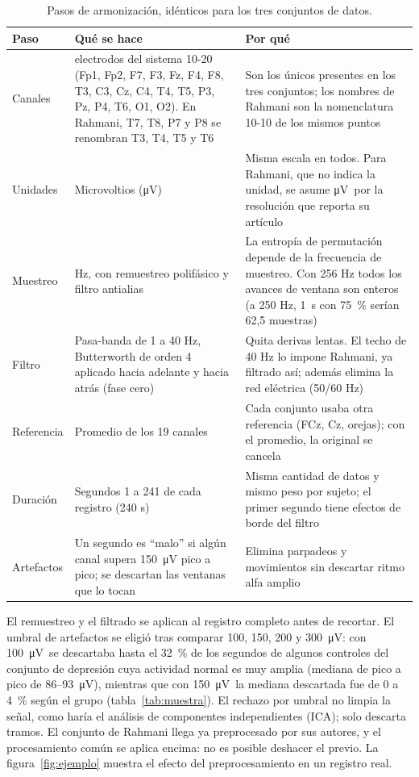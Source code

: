 \documentclass[11pt,a4paper]{article}
\newcommand{\uV}{\si{\micro\volt}}
\begin{document}
\begin{table}[ht]
\centering\small
\caption{Pasos de armonización, idénticos para los tres conjuntos de datos.}
\label{tab:preproc}
\begin{tabularx}{\textwidth}{@{}>{\raggedright\arraybackslash}p{1.9cm} >{\raggedright\arraybackslash}X >{\raggedright\arraybackslash}X@{}}
\toprule
Paso & Qué se hace & Por qué \\
\midrule
Canales & 19 electrodos del sistema 10-20 (Fp1, Fp2, F7, F3, Fz, F4, F8, T3, C3, Cz, C4, T4, T5, P3, Pz, P4, T6, O1, O2). En Rahmani, T7, T8, P7 y P8 se renombran T3, T4, T5 y T6 & Son los únicos presentes en los tres conjuntos; los nombres de Rahmani son la nomenclatura 10-10 de los mismos puntos \\
Unidades & Microvoltios (\uV) & Misma escala en todos. Para Rahmani, que no indica la unidad, se asume \uV\ por la resolución que reporta su artículo \\
Muestreo & 256 Hz, con remuestreo polifásico y filtro antialias & La entropía de permutación depende de la frecuencia de muestreo. Con 256 Hz todos los avances de ventana son enteros (a 250 Hz, 1~s con 75~\% serían 62,5 muestras) \\
Filtro & Pasa-banda de 1 a 40 Hz, Butterworth de orden 4 aplicado hacia adelante y hacia atrás (fase cero) & Quita derivas lentas. El techo de 40 Hz lo impone Rahmani, ya filtrado así; además elimina la red eléctrica (50/60 Hz) \\
Referencia & Promedio de los 19 canales & Cada conjunto usaba otra referencia (FCz, Cz, orejas); con el promedio, la original se cancela \\
Duración & Segundos 1 a 241 de cada registro (240 s) & Misma cantidad de datos y mismo peso por sujeto; el primer segundo tiene efectos de borde del filtro \\
Artefactos & Un segundo es \enquote{malo} si algún canal supera \SI{150}{\micro\volt} pico a pico; se descartan las ventanas que lo tocan & Elimina parpadeos y movimientos sin descartar ritmo alfa amplio \\
\bottomrule
\end{tabularx}
\end{table}

El remuestreo y el filtrado se aplican al registro completo antes de recortar. El umbral de artefactos se eligió tras comparar 100, 150, 200 y 300~\uV: con 100~\uV\ se descartaba hasta el 32~\% de los segundos de algunos controles del conjunto de depresión cuya actividad normal es muy amplia (mediana de pico a pico de 86--93~\uV), mientras que con 150~\uV\ la mediana descartada fue de 0 a 4~\% según el grupo (tabla~\ref{tab:muestra}). El rechazo por umbral no limpia la señal, como haría el análisis de componentes independientes (ICA); solo descarta tramos. El conjunto de Rahmani llega ya preprocesado por sus autores, y el procesamiento común se aplica encima: no es posible deshacer el previo. La figura~\ref{fig:ejemplo} muestra el efecto del preprocesamiento en un registro real.
\end{document}
